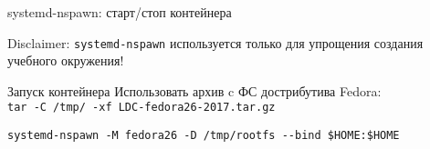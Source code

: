\begin{frame}[fragile]{systemd-nspawn: старт/стоп контейнера}
    \begin{alert}{Disclaimer}:
        {\tt systemd-nspawn} используется только для упрощения создания учебного окружения!
    \end{alert}
    \begin{block}{Запуск контейнера}
        Использовать архив c ФС дострибутива Fedora:\\
        {\tt tar -C /tmp/ -xf LDC-fedora26-2017.tar.gz}

	\begin{lstlisting}
systemd-nspawn -M fedora26 -D /tmp/rootfs --bind $HOME:$HOME
\end{lstlisting}
    \end{block}
\end{frame}